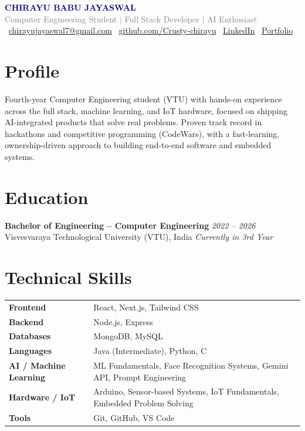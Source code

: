 \documentclass[a4paper,10pt]{article}
\begin{document}
\begin{center}
{\LARGE \textbf{\textcolor{darkblue}{CHIRAYU BABU JAYASWAL}}}\\[3pt]
{\small \textcolor{graytext}{Computer Engineering Student $\vert$ Full Stack Developer $\vert$ AI Enthusiast}}\\[6pt]
{\small
\faEnvelope\ \href{mailto:chirayujayaswal7@gmail.com}{chirayujayaswal7@gmail.com}
\quad\textbar\quad
\faGithub\ \href{https://github.com/Crusty-chirayu}{github.com/Crusty-chirayu}
\quad\textbar\quad
\faLinkedin\ \href{https://linkedin.com/in/chirayu-babu-jaysawal-916a6a2a2}{LinkedIn}
\quad\textbar\quad
\faGlobe\ \href{https://portfolio-lac-kappa-49.vercel.app/}{Portfolio}
}
\end{center}
\vspace{-6pt}

\section*{Profile}
Fourth-year Computer Engineering student (VTU) with hands-on experience across the full stack, machine learning, and IoT hardware, focused on shipping AI-integrated products that solve real problems. Proven track record in hackathons and competitive programming (CodeWars), with a fast-learning, ownership-driven approach to building end-to-end software and embedded systems.

\section*{Education}
\textbf{Bachelor of Engineering -- Computer Engineering} \hfill \textit{2022 -- 2026}\\
Visvesvaraya Technological University (VTU), India \hfill \textit{Currently in 3rd Year}

\section*{Technical Skills}
\begin{tabularx}{\linewidth}{@{}l X@{}}
\textbf{Frontend} & React, Next.js, Tailwind CSS \\
\textbf{Backend} & Node.js, Express \\
\textbf{Databases} & MongoDB, MySQL \\
\textbf{Languages} & Java (Intermediate), Python, C \\
\textbf{AI / Machine Learning} & ML Fundamentals, Face Recognition Systems, Gemini API, Prompt Engineering \\
\textbf{Hardware / IoT} & Arduino, Sensor-based Systems, IoT Fundamentals, Embedded Problem Solving \\
\textbf{Tools} & Git, GitHub, VS Code \\
\end{tabularx}
\end{document}
